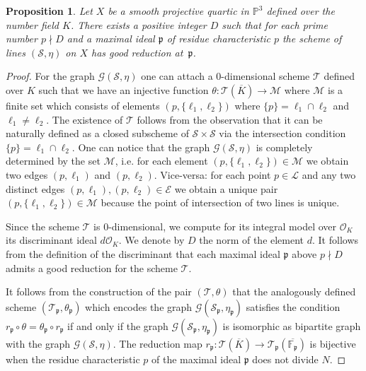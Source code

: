 \documentclass{article}
\theoremstyle{plain}
\newtheorem{proposition}[thm]{Proposition}
\theoremstyle{definition}
\numberwithin{equation}{section}
\begin{document}
\begin{proposition}\label{prop:good_reduction}
Let $X$ be a smooth projective quartic in $\mathbb{P}^{3}$ defined over the number field $K$. There exists a positive integer $D$ such that for each prime number $p\nmid D$ and a maximal ideal $\mathfrak{p}$ of residue characteristic $p$ the scheme of lines $(\mathcal{S},\eta)$ on $X$ has good reduction at~$\mathfrak{p}$.
\end{proposition}
\begin{proof}
For the graph $\mathcal{G}(\mathcal{S},\eta)$ one can attach a $0$-dimensional scheme $\mathcal{T}$ defined over $K$ such that we have an injective function $\theta:\mathcal{T}(\overline{K})\rightarrow \mathcal{M}$ where $\mathcal{M}$ is a finite set which consists of elements $(p,\{\ell_{1},\ell_{2}\})$ where $\{p\} = \ell_{1}\cap\ell_{2}$ and $\ell_{1}\neq \ell_{2}$. The existence of $\mathcal{T}$ follows from the observation that it can be naturally defined as a closed subscheme of $\mathcal{S}\times\mathcal{S}$ via the intersection condition $\{p\} = \ell_{1}\cap\ell_{2}$. One can notice that the graph $\mathcal{G}(\mathcal{S},\eta)$ is completely determined by the set $\mathcal{M}$, i.e. for each element $(p,\{\ell_{1},\ell_{2}\})\in\mathcal{M}$ we obtain two edges $(p,\ell_{1})$ and $(p,\ell_2)$. Vice-versa: for each point $p\in\mathcal{L}$ and any two distinct edges $(p,\ell_{1}), (p,\ell_{2}) \in \mathcal{E}$  we obtain a unique pair $(p,\{\ell_{1},\ell_{2}\})\in\mathcal{M}$ because the point of intersection of two lines is unique.

Since the scheme $\mathcal{T}$ is $0$-dimensional, we compute for its integral model over $\mathcal{O}_{K}$ its discriminant ideal $d\mathcal{O}_{K}$. We denote by $D$ the norm of the element $d$. It follows from the definition of the discriminant that each maximal ideal $\mathfrak{p}$ above $p\nmid D$ admits a good reduction for the scheme $\mathcal{T}$.

It follows from the construction of the pair $(\mathcal{T},\theta)$ that the analogously defined scheme $(\mathcal{T}_{\mathfrak{p}},\theta_{\mathfrak{p}})$ which encodes the graph $\mathcal{G}(\mathcal{S}_{\mathfrak{p}},\eta_{\mathfrak{p}})$ satisfies the condition $r_{\mathfrak{p}}\circ\theta = \theta_{\mathfrak{p}}\circ r_{\mathfrak{p}}$ if and only if the graph $\mathcal{G}(\mathcal{S}_{\mathfrak{p}},\eta_{\mathfrak{p}})$ is isomorphic as bipartite graph with the graph $\mathcal{G}(\mathcal{S},\eta)$. The reduction map $r_{\mathfrak{p}}:\mathcal{T}(\overline{K})\rightarrow \mathcal{T}_{\mathfrak{p}}(\overline{\mathbb{F}_{\mathfrak{p}}})$ is bijective when the residue characteristic $p$ of the maximal ideal $\mathfrak{p}$ does not divide $N$.
\end{proof}
\end{document}
